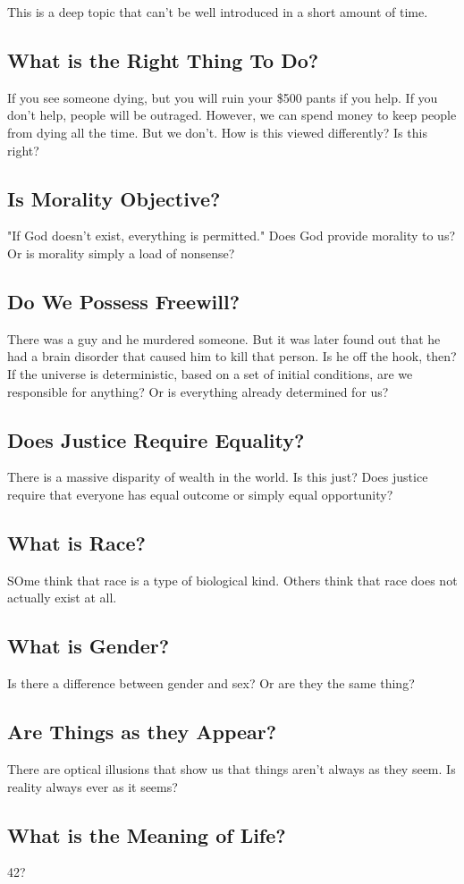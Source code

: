 \documentclass{article}
\begin{document}
This is a deep topic that can't be well introduced in a short amount of time.

\subsection{What is the Right Thing To Do?}

If you see someone dying, but you will ruin your \$500 pants if you help. If you
don't help, people will be outraged. However, we can spend money to keep people
from dying all the time. But we don't. How is this viewed differently? Is this
right?

\subsection{Is Morality Objective?}

"If God doesn't exist, everything is permitted." Does God provide morality to
us? Or is morality simply a load of nonsense?

\subsection{Do We Possess Freewill?}

There was a guy and he murdered someone. But it was later found out that he had
a brain disorder that caused him to kill that person. Is he off the hook, then?
If the universe is deterministic, based on a set of initial conditions, are we
responsible for anything? Or is everything already determined for us?

\subsection{Does Justice Require Equality?}

There is a massive disparity of wealth in the world. Is this just? Does justice
require that everyone has equal outcome or simply equal opportunity?

\subsection{What is Race?}

SOme think that race is a type of biological kind. Others think that race does
not actually exist at all.

\subsection{What is Gender?}

Is there a difference between gender and sex? Or are they the same thing?

\subsection{Are Things as they Appear?}

There are optical illusions that show us that things aren't always as they seem.
Is reality always ever as it seems?

\subsection{What is the Meaning of Life?}

42?
\end{document}
